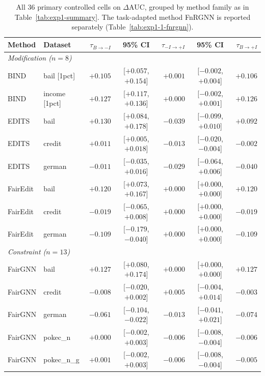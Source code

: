 \begin{table}[t]
\centering
\caption{All 36 primary controlled cells on $\Delta$AUC, grouped by method family as in Table~\ref{tab:exp1-summary}. The task-adapted method FnRGNN is reported separately (Table~\ref{tab:exp1-1-fnrgnn}).}
\label{tab:exp1-cells-dAUC}
\scriptsize
\vspace{-0.2cm}
\begin{tabular}{llrcrcr}
\toprule
Method & Dataset & $\tau_{B\rightarrow -I}$ & 95\% CI & $\tau_{-I\rightarrow +I}$ & 95\% CI & $\tau_{B\rightarrow +I}$ \\
\midrule
\multicolumn{7}{l}{\textit{Modification ($n=8$)}} \\
BIND & bail [1pct] & $+0.105$ & [$+0.057$, $+0.154$] & $+0.001$ & [$-0.002$, $+0.004$] & $+0.106$ \\
BIND & income [1pct] & $+0.127$ & [$+0.117$, $+0.136$] & $+0.000$ & [$-0.002$, $+0.001$] & $+0.126$ \\
\midrule
EDITS & bail & $+0.130$ & [$+0.084$, $+0.178$] & $-0.039$ & [$-0.099$, $+0.010$] & $+0.092$ \\
EDITS & credit & $+0.011$ & [$+0.005$, $+0.018$] & $\mathbf{-0.013}$ & [$-0.020$, $-0.004$] & $-0.002$ \\
EDITS & german & $-0.011$ & [$-0.035$, $+0.016$] & $-0.029$ & [$-0.064$, $+0.006$] & $-0.040$ \\
\midrule
FairEdit & bail & $+0.120$ & [$+0.073$, $+0.167$] & $+0.000$ & [$+0.000$, $+0.000$] & $+0.120$ \\
FairEdit & credit & $-0.019$ & [$-0.065$, $+0.008$] & $+0.000$ & [$+0.000$, $+0.000$] & $-0.019$ \\
FairEdit & german & $-0.109$ & [$-0.179$, $-0.040$] & $+0.000$ & [$+0.000$, $+0.000$] & $-0.109$ \\
\midrule
\multicolumn{7}{l}{\textit{Constraint ($n=13$)}} \\
FairGNN & bail & $+0.127$ & [$+0.080$, $+0.174$] & $+0.000$ & [$+0.000$, $+0.000$] & $+0.127$ \\
FairGNN & credit & $-0.008$ & [$-0.020$, $+0.002$] & $+0.005$ & [$-0.004$, $+0.014$] & $-0.003$ \\
FairGNN & german & $-0.061$ & [$-0.104$, $-0.022$] & $-0.013$ & [$-0.041$, $+0.021$] & $-0.074$ \\
FairGNN & pokec\_n & $+0.000$ & [$-0.002$, $+0.003$] & $-0.006$ & [$-0.008$, $-0.004$] & $-0.006$ \\
FairGNN & pokec\_n\_g & $+0.001$ & [$-0.002$, $+0.003$] & $-0.006$ & [$-0.008$, $-0.004$] & $-0.005$ \\

\end{tabular}
\end{table}
